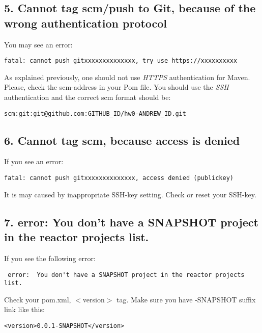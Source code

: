 \subsection{5. Cannot tag scm/push to Git, because of the wrong authentication protocol}

You may see an error:
\begin{verbatim}
fatal: cannot push gitxxxxxxxxxxxxxx, try use https://xxxxxxxxxx
\end{verbatim}

As explained previously, one should not use \emph{HTTPS} authentication 
for Maven. Please, check the scm-address in your Pom file.
You should use the \emph{SSH} authentication and the correct scm format 
should be:
\begin{verbatim}
scm:git:git@github.com:GITHUB_ID/hw0-ANDREW_ID.git
\end{verbatim}

\subsection{6. Cannot tag scm, because access is denied}

If you see an error:
\begin{verbatim}
fatal: cannot push gitxxxxxxxxxxxxxx, access denied (publickey)
\end{verbatim}
It is may caused by inappropriate SSH-key setting. Check or reset your SSH-key.

\subsection{7. 
 error:  You don't have a SNAPSHOT project in the reactor projects list.}
If you see the following error:
\begin{verbatim}
 error:  You don't have a SNAPSHOT project in the reactor projects list.
\end{verbatim}
Check your pom.xml, $<$version$>$ tag. Make sure you have -SNAPSHOT suffix link like this: 
\begin{verbatim}
<version>0.0.1-SNAPSHOT</version>
\end{verbatim}


